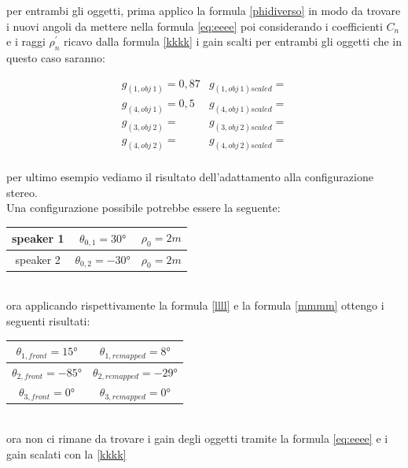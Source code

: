 \documentclass[12pt,a4paper]{report}
\begin{document}
per entrambi gli oggetti, prima applico la formula \ref{phidiverso} in modo da trovare i nuovi angoli da mettere nella formula \ref{eq:eeee} poi considerando i coefficienti $C_n$ e i raggi $\rho_n^{\prime}$ ricavo dalla formula \ref{kkkk} i gain scalti per entrambi gli oggetti che in questo caso saranno:

\begin{equation}
\begin{matrix}
g_{(1,obj\ 1)} = 0,87 & g_{(1,obj\ 1)scaled} = \\ 
g_{(4,obj\ 1)} = 0,5 & g_{(4,obj\ 1)scaled} = \\
g_{(3,obj\ 2)} = & g_{(3,obj\ 2)scaled} = \\
g_{(4,obj\ 2)} = & g_{(4,obj\ 2)scaled} = \\
\end{matrix} 
\label{gscalatiesempio1}
\end{equation}



per ultimo esempio vediamo il risultato dell'adattamento alla configurazione stereo.\\

Una configurazione possibile potrebbe essere la seguente:\\

\begin{tabular}{|c|c|c|}
\hline 
speaker 1 & $\theta_{0,1}=30°$ & $\rho_0=2m$\\ 
\hline 
speaker 2 & $\theta_{0,2}=-30°$ & $\rho_0=2m$\\ 
\hline 
\end{tabular} \\

ora applicando rispettivamente la formula \ref{llll} e la formula \ref{mmmm} ottengo i seguenti risultati:\\


\begin{tabular}{|c|c|}
\hline 
$\theta_{1,front} = 15°$     & $\theta_{1,remapped} =  8°  $   \\ 
\hline 
$\theta_{2,front} = -85°$     & $\theta_{2,remapped} = -29° $     \\
\hline  
$\theta_{3,front} = 0°$    & $ \theta_{3,remapped} =  0° $    \\
\hline
\end{tabular} \\

ora non ci rimane da trovare i gain degli oggetti tramite la formula \ref{eq:eeee} e i gain scalati con la \ref{kkkk}
\end{document}
